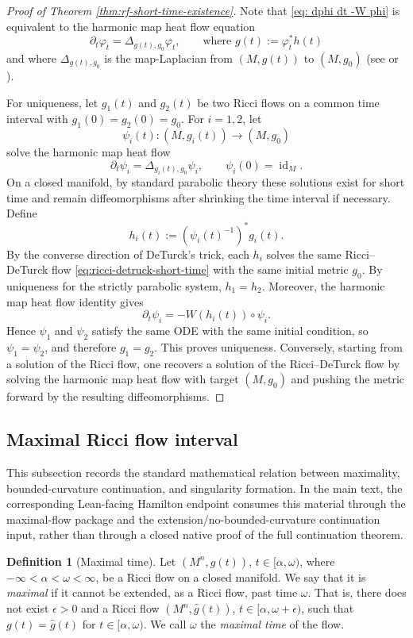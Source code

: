 \documentclass[11pt]{article}
\theoremstyle{plain}
\theoremstyle{definition}
\newtheorem{definition}[theorem]{Definition}
\theoremstyle{remark}
\begin{document}
\begin{proof}[Proof of Theorem \ref{thm:rf-short-time-existence}]
Note that \eqref{eq: dphi dt -W phi} is equivalent to the harmonic map heat flow equation
\[
\partial_t \varphi_t = \Delta_{g(t),g_0}\varphi_t,
\qquad\text{where } g(t):=\varphi_t^*h(t)
\]
and where $\Delta_{g(t),g_0}$ is the map-Laplacian from $(M,g(t))$ to $(M,g_0)$
(see \cite[\S 4.3 of Chapter 3]{MR2061425} or \cite[p.~117]{MR2274812}).\smallskip 


For uniqueness, let $g_1(t)$ and $g_2(t)$ be two Ricci flows on a common time
interval with $g_1(0)=g_2(0)=g_0$. For $i=1,2$, let
\[
\psi_i(t): (M,g_i(t))\to (M,g_0)
\]
solve the harmonic map heat flow
\[
\partial_t\psi_i=\Delta_{g_i(t),g_0}\psi_i,
\qquad
\psi_i(0)=\operatorname{id}_M.
\]
On a closed manifold, 
by standard parabolic theory
these solutions exist for short time and remain
diffeomorphisms after shrinking the time interval if necessary. Define
\[
h_i(t) :=  (\psi_i(t)^{-1})^*g_i(t).
\]
By the converse direction of DeTurck's trick, each $h_i$ solves the same
Ricci--DeTurck flow \eqref{eq:ricci-detruck-short-time} with the same initial
metric $g_0$. By uniqueness for the strictly parabolic system, $h_1=h_2$.
Moreover, the harmonic map heat flow identity gives
\[
\partial_t\psi_i=-W(h_i(t))\circ\psi_i.
\]
Hence $\psi_1$ and $\psi_2$ satisfy the same ODE with the same initial
condition, so $\psi_1=\psi_2$, and therefore $g_1=g_2$. This proves uniqueness.
Conversely, starting from a solution of the Ricci flow, one recovers a solution of the Ricci--DeTurck flow by solving the harmonic map heat flow with target $(M,g_0)$ and pushing the metric forward by the resulting diffeomorphisms.
\end{proof}

\subsection{Maximal Ricci flow interval}\label{subsec:MaxRicciFlowInterval}

This subsection records the standard mathematical relation between maximality,
bounded-curvature continuation, and singularity formation.  In the main text,
the corresponding Lean-facing Hamilton endpoint consumes this material through
the maximal-flow package and the extension/no-bounded-curvature continuation
input, rather than through a closed native proof of the full continuation
theorem.

\begin{definition}[Maximal time]\label{def: max Ricci flow}
    Let $(M^n,g(t))$, $t\in [\alpha,\omega)$, where $-\infty < \alpha < \omega <  \infty$, be a Ricci
flow on a closed manifold.
We say that it is \emph{maximal} if it cannot be extended, as a Ricci
flow, past time $\omega$.
That is, there does not exist $\epsilon >0$ and a Ricci flow $(M^n,\widehat{g}(t))$, $t\in [\alpha,\omega+\epsilon)$, such that $g(t)=\widehat{g}(t)$ for $t\in [\alpha,\omega)$.
We call $\omega$ the \emph{maximal time} of the flow.
\end{definition}
\end{document}
